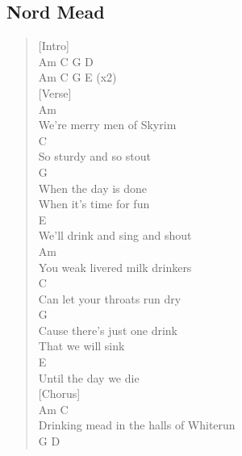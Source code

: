 \documentclass[11pt]{article}
\begin{document}
\subsection{Nord Mead}
\label{sec:org0d318f2}
\begin{verse}
[Intro]\\
Am C G D\\
Am C G E    (x2)\\
\vspace*{1em}
[Verse]\\
\hspace*{6em}Am\\
We're merry men of Skyrim\\
\hspace*{4em}C\\
So sturdy and so stout\\
\hspace*{9em}G\\
When the day is done\\
\vspace*{1em}
When it's time for fun\\
\hspace*{7em}E\\
We'll drink and sing and shout\\
\vspace*{1em}
\vspace*{1em}
\hspace*{4em}Am\\
You weak livered milk drinkers\\
\hspace*{4em}C\\
Can let your throats run dry\\
\hspace*{14em}G\\
Cause there's just one drink\\
\vspace*{1em}
That we will sink\\
\hspace*{2em}E\\
Until the day we die\\
\vspace*{1em}
[Chorus]\\
\hspace*{9em}Am                   C\\
Drinking mead in the halls of Whiterun\\
\hspace*{4em}G               D\\

\end{verse}
\end{document}
